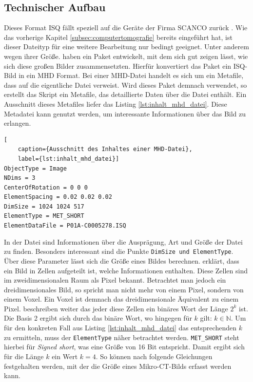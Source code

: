 \subsection{Technischer Aufbau}
\label{subsec:datensätze} Dieses Format \ac{ISQ} fällt speziell auf die Geräte der
Firma SCANCO zurück \citep[vgl.][]{scanco2024}. Wie das vorherige Kapitel \ref{subsec:computertomografie}
bereits eingeführt hat, ist dieser Dateityp für eine weitere Bearbeitung nur
bedingt geeignet. Unter anderem wegen ihrer Größe. \citet[S.~118-119]{RoeschKunzelmann2018}
haben ein Paket entwickelt, mit dem sich gut zeigen lässt, wie sich diese großen
Bilder zusammensetzten. Hierfür konvertiert das Paket ein \ac{ISQ}-Bild in ein \ac{MHD}
Format. Bei einer \ac{MHD}-Datei handelt es sich um ein Metafile, dass auf die eigentliche
Datei verweist. Wird dieses Paket demnach verwendet, so erstellt das Skript ein Metafile,
das detaillierte Daten über die Datei enthält. Ein Ausschnitt dieses Metafiles liefer
das Listing \ref{lst:inhalt_mhd_datei}. Diese Metadatei kann genutzt werden, um interessante
Informationen über das Bild zu erlangen.

\begin{lstlisting}[
	caption={Ausschnitt des Inhaltes einer MHD-Datei},
	label={lst:inhalt_mhd_datei}]
ObjectType = Image
NDims = 3
CenterOfRotation = 0 0 0
ElementSpacing = 0.02 0.02 0.02
DimSize = 1024 1024 517
ElementType = MET_SHORT
ElementDataFile = P01A-C0005278.ISQ
\end{lstlisting}

In der Datei sind Informationen über die Ausprägung, Art und Größe der Datei zu finden.
Besonders interessant sind die Punkte \texttt{DimSize und ElementType}. Über
diese Parameter lässt sich die Größe eines Bildes berechnen. \citet[S.~10-11]{burger2009}
erklärt, dass ein Bild in Zellen aufgeteilt ist, welche Informationen enthalten.
Diese Zellen sind im zweidimensionalen Raum als Pixel bekannt. Betrachtet man
jedoch ein dreidimensionales Bild, so spricht man nicht mehr von einem Pixel,
sondern von einem Voxel. Ein Voxel ist demnach das dreidimensionale Äquivalent zu
einem Pixel. \citet[S.~10-11]{burger2009} beschreiben weiter das jeder diese Zellen
ein binäres Wort der Länge $2^{k}$ ist. Die Basis 2 ergibt sich durch das binäre
Wort, wo hingegen für $k$ gilt: $k \in \mathbb{N}$. Um für den konkreten Fall aus
Listing \ref{lst:inhalt_mhd_datei} das entsprechenden $k$ zu ermitteln, muss der
\texttt{ElementType} näher betrachtet werden. \texttt{MET\_SHORT} steht hierbei für
\textit{Signed short}, was eine Größe von 16 Bit entspricht. Damit ergibt sich
für die Länge $k$ ein Wert $k = 4$. So können nach \citet[S.~10-11]{burger2009}
folgende Gleichungen festgehalten werden, mit der die Größe eines Mikro-\ac{CT}-Bilds
erfasst werden kann.

